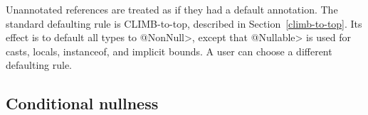 Unannotated references are treated as if they had a default annotation.
The standard defaulting rule is CLIMB-to-top,  described in
Section~\ref{climb-to-top}.  Its effect is to default all types to
\<@NonNull>, except that \<@Nullable> is used for casts, locals,
instanceof, and implicit bounds.  A user can choose a different defaulting
rule.

%


\subsection{Conditional nullness\label{conditional-nullness}}

